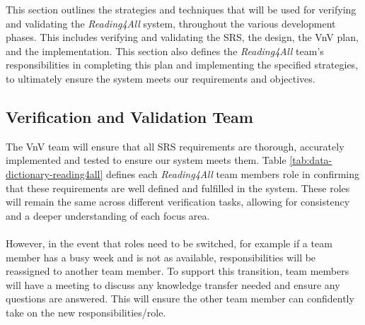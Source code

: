 \documentclass[12pt, titlepage]{article}
\begin{document}
This section outlines the strategies and techniques that will be used for verifying and validating the \textit{Reading4All} system, throughout the various development phases. 
This includes verifying and validating the SRS, the design, the VnV plan, and the implementation. This section also defines the \textit{Reading4All} team's responsibilities in 
completing this plan and implementing the specified strategies, to ultimately ensure the system meets our requirements and objectives.
\newpage
\subsection{Verification and Validation Team}

The VnV team will ensure that all SRS requirements are thorough, accurately implemented and tested to ensure our system meets them. 
Table \ref{tab:data-dictionary-reading4all} defines each \textit{Reading4All} team members role in confirming that these requirements are well defined and fulfilled in the system.
These roles will remain the same across different verification tasks, allowing for consistency and a deeper understanding of each focus area. \\\\
However, in the event that roles need to be switched, for example 
if a team member has a busy week and is not as available, responsibilities will be reassigned to another team member. 
To support this transition, team members will have a meeting to discuss any knowledge transfer needed and ensure any questions are answered. This 
will ensure the other team member can confidently take on the new responsibilities/role. 
\end{document}
